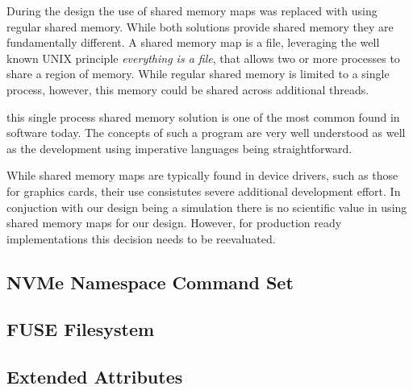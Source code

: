 During the design the use of shared memory maps was replaced with using regular
shared memory. While both solutions provide shared memory they are fundamentally
different. A shared memory map is a file, leveraging the well known UNIX
principle \textit{everything is a file}, that allows two or more processes to
share a region of memory. While regular shared memory is limited to a single
process, however, this memory could be shared across additional threads.

this single process shared memory solution is one of the most common found in
software today. The concepts of such a program are very well understood as
well as the development using imperative languages being straightforward.

While shared memory maps are typically found in device drivers, such as those
for graphics cards, their use consistutes severe additional development effort.
In conjuction with our design being a simulation there is no scientific value in
using shared memory maps for our design. However, for production ready
implementations this decision needs to be reevaluated.

\subsection{NVMe Namespace Command Set}



\subsection{FUSE Filesystem}


\subsection{Extended Attributes}


